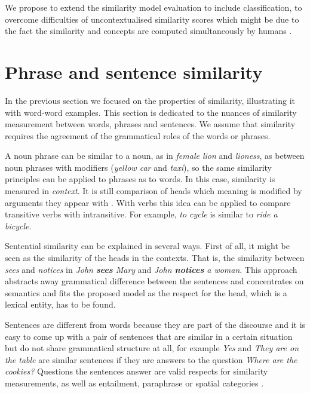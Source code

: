 \documentclass[11pt]{article}
\begin{document}
We propose to extend the similarity model evaluation to include classification, to overcome difficulties of uncontextualised similarity scores which might be due to the fact the similarity and concepts are computed simultaneously by humans \cite{hahn1997concepts}.

\section{Phrase and sentence similarity}

In the previous section we focused on the properties of similarity, illustrating it with word-word examples. This section is dedicated to the nuances of similarity measurement between words, phrases and sentences. We assume that similarity requires the agreement of the grammatical roles of the words or phrases.

A noun phrase can be similar to a noun, as in \textit{female lion} and \textit{lioness}, as between noun phrases with modifiers (\textit{yellow car} and \textit{taxi}), so the same similarity principles can be applied to phrases as to words. In this case, similarity is measured in \emph{context}. It is still comparison of heads which meaning is modified by arguments they appear with \cite{Dinu:2010:MDS:1870658.1870771,mitchell2010composition}. With verbs this idea can be applied to compare transitive verbs with intransitive. For example, \textit{to cycle} is similar to \textit{ride a bicycle}.

Sentential similarity can be explained in several ways. First of all, it might be seen as the similarity of the heads in the contexts. That is, the similarity between \textit{sees} and \textit{notices} in \textit{John \textbf{sees} Mary} and \textit{John \textbf{notices} a woman}. This approach abstracts away grammatical difference between the sentences and concentrates on semantics and fits the proposed model as the respect for the head, which is a lexical entity, has to be found.

Sentences are different from words because they are part of the discourse and it is easy to come up with a pair of sentences that are similar in a certain situation but do not share grammatical structure at all, for example \textit{Yes} and \textit{They are on the table} are similar sentences if they are answers to the question \textit{Where are the cookies?} Questions the sentences answer are valid respects for similarity measurements, as well as entailment, paraphrase \cite{White:2015:WSE:2838931.2838932} or spatial categories \cite{ritter-EtAl:2015:*SEM2015}.
\end{document}
